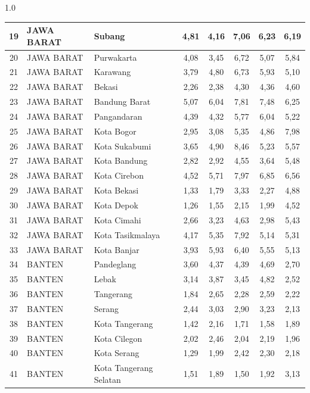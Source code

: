 \begin{spacing}{1.0}
\begin{longtable}{|c|p{2.2cm}|p{2.8cm}|c|c|c|c|c|}
19 & JAWA BARAT & Subang & 4,81 & 4,16 & 7,06 & 6,23 & 6,19 \\ \hline
20 & JAWA BARAT & Purwakarta & 4,08 & 3,45 & 6,72 & 5,07 & 5,84 \\ \hline
21 & JAWA BARAT & Karawang & 3,79 & 4,80 & 6,73 & 5,93 & 5,10 \\ \hline
22 & JAWA BARAT & Bekasi & 2,26 & 2,38 & 4,30 & 4,36 & 4,60 \\ \hline
23 & JAWA BARAT & Bandung Barat & 5,07 & 6,04 & 7,81 & 7,48 & 6,25 \\ \hline
24 & JAWA BARAT & Pangandaran & 4,39 & 4,32 & 5,77 & 6,04 & 5,22 \\ \hline
25 & JAWA BARAT & Kota Bogor & 2,95 & 3,08 & 5,35 & 4,86 & 7,98 \\ \hline
26 & JAWA BARAT & Kota Sukabumi & 3,65 & 4,90 & 8,46 & 5,23 & 5,57 \\ \hline
27 & JAWA BARAT & Kota Bandung & 2,82 & 2,92 & 4,55 & 3,64 & 5,48 \\ \hline
28 & JAWA BARAT & Kota Cirebon & 4,52 & 5,71 & 7,97 & 6,85 & 6,56 \\ \hline
29 & JAWA BARAT & Kota Bekasi & 1,33 & 1,79 & 3,33 & 2,27 & 4,88 \\ \hline
30 & JAWA BARAT & Kota Depok & 1,26 & 1,55 & 2,15 & 1,99 & 4,52 \\ \hline
31 & JAWA BARAT & Kota Cimahi & 2,66 & 3,23 & 4,63 & 2,98 & 5,43 \\ \hline
32 & JAWA BARAT & Kota Tasikmalaya & 4,17 & 5,35 & 7,92 & 5,14 & 5,31 \\ \hline
33 & JAWA BARAT & Kota Banjar & 3,93 & 5,93 & 6,40 & 5,55 & 5,13 \\ \hline
34 & BANTEN & Pandeglang & 3,60 & 4,37 & 4,39 & 4,69 & 2,70 \\ \hline
35 & BANTEN & Lebak & 3,14 & 3,87 & 3,45 & 4,82 & 2,52 \\ \hline
36 & BANTEN & Tangerang & 1,84 & 2,65 & 2,28 & 2,59 & 2,22 \\ \hline
37 & BANTEN & Serang & 2,44 & 3,03 & 2,90 & 3,23 & 2,13 \\ \hline
38 & BANTEN & Kota Tangerang & 1,42 & 2,16 & 1,71 & 1,58 & 1,89 \\ \hline
39 & BANTEN & Kota Cilegon & 2,02 & 2,46 & 2,04 & 2,19 & 1,96 \\ \hline
40 & BANTEN & Kota Serang & 1,29 & 1,99 & 2,42 & 2,30 & 2,18 \\ \hline
41 & BANTEN & Kota Tangerang Selatan & 1,51 & 1,89 & 1,50 & 1,92 & 3,13 \\ \hline
\end{longtable}
\end{spacing}
\newpage
